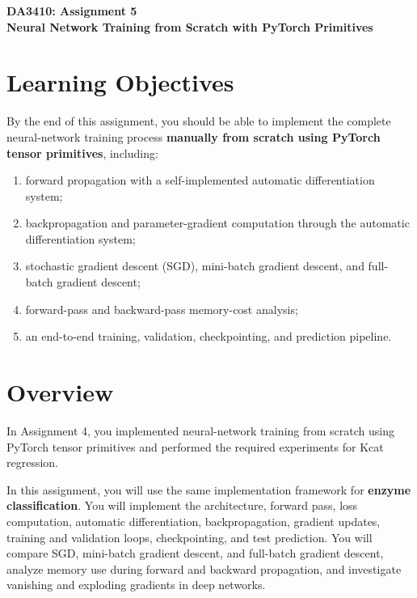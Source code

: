 \documentclass[11pt,a4paper]{article}
\begin{document}
\begin{center}
    {\LARGE \textbf{DA3410: Assignment 5}}\\[0.4em]
    {\Large \textbf{Neural Network Training from Scratch with PyTorch Primitives}}\\[1em]
\end{center}

\section{Learning Objectives}

By the end of this assignment, you should be able to implement the complete neural-network training process \textbf{manually from scratch using PyTorch tensor primitives}, including:

\begin{enumerate}
    \item forward propagation with a self-implemented automatic differentiation system;
    \item backpropagation and parameter-gradient computation through the automatic differentiation system;
    \item stochastic gradient descent (SGD), mini-batch gradient descent, and full-batch gradient descent;
    \item forward-pass and backward-pass memory-cost analysis;
    \item an end-to-end training, validation, checkpointing, and prediction pipeline.
\end{enumerate}

\section{Overview}

In Assignment 4, you implemented neural-network training from scratch using PyTorch tensor primitives and performed the required experiments for Kcat regression.

In this assignment, you will use the same implementation framework for \textbf{enzyme classification}. You will implement the architecture, forward pass, loss computation, automatic differentiation, backpropagation, gradient updates, training and validation loops, checkpointing, and test prediction. You will compare SGD, mini-batch gradient descent, and full-batch gradient descent, analyze memory use during forward and backward propagation, and investigate vanishing and exploding gradients in deep networks.
\end{document}
